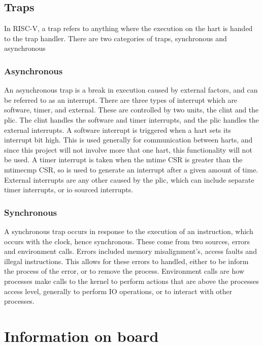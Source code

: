 \subsection{Traps}
In RISC-V, a trap refers to anything where the execution on the hart is handed to the trap handler. There are two categories of traps, synchronous and asynchronous
\subsubsection{Asynchronous}
An asynchronous trap is a break in execution caused by external factors, and can be referred to as an interrupt. There are three types of interrupt which are software, timer, and external. These are controlled by two units, the \ac{clint} and the \ac{plic}. The \ac{clint} handles the software and timer interrupts, and the \ac{plic} handles the external interrupts. A software interrupt is triggered when a hart sets its interrupt bit high. This is used generally for communication between harts, and since this project will not involve more that one hart, this functionality will not be used. A timer interrupt is taken when the mtime CSR is greater than the mtimecmp CSR, so is used to generate an interrupt after a given amount of time. External interrupts are any other caused by the \ac{plic}, which can include separate timer interrupts, or \ac{io} sourced interrupts.
\subsubsection{Synchronous}
A synchronous trap occurs in response to the execution of an instruction, which occurs with the clock, hence synchronous. These come from two sources, errors and environment calls. Errors included memory misalignment's, access faults and illegal instructions. This allows for these errors to handled, either to be inform the process of the error, or to remove the process. Environment calls are how processes make calls to the kernel to perform actions that are above the processes access level, generally to perform IO operations, or to interact with other processes.
\section{Information on board}